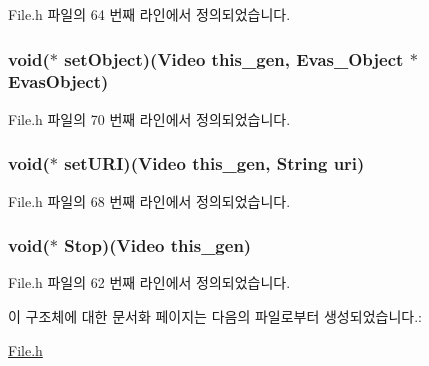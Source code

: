 File.\-h 파일의 64 번째 라인에서 정의되었습니다.

\hypertarget{struct___video_a1245c2a3dff66080a4c0f9fd812c25e1}{
\subsubsection[{set\-Object}]{\setlength{\rightskip}{0pt plus 5cm}void($\ast$  set\-Object)({\bf Video} this\-\_\-gen, Evas\-\_\-\-Object $\ast$Evas\-Object)}}\label{struct___video_a1245c2a3dff66080a4c0f9fd812c25e1}


File.\-h 파일의 70 번째 라인에서 정의되었습니다.

\hypertarget{struct___video_a1b806abc2d87bcfdb8fc81eeb349062e}{
\subsubsection[{set\-U\-R\-I}]{\setlength{\rightskip}{0pt plus 5cm}void($\ast$  set\-U\-R\-I)({\bf Video} this\-\_\-gen, {\bf String} uri)}}\label{struct___video_a1b806abc2d87bcfdb8fc81eeb349062e}


File.\-h 파일의 68 번째 라인에서 정의되었습니다.

\hypertarget{struct___video_ad9c252b2b06ead2f188d91339e651485}{
\subsubsection[{Stop}]{\setlength{\rightskip}{0pt plus 5cm}void($\ast$  Stop)({\bf Video} this\-\_\-gen)}}\label{struct___video_ad9c252b2b06ead2f188d91339e651485}


File.\-h 파일의 62 번째 라인에서 정의되었습니다.



이 구조체에 대한 문서화 페이지는 다음의 파일로부터 생성되었습니다.\-:\begin{DoxyCompactItemize}
\item 
\hyperlink{_file_8h}{File.\-h}\end{DoxyCompactItemize}

